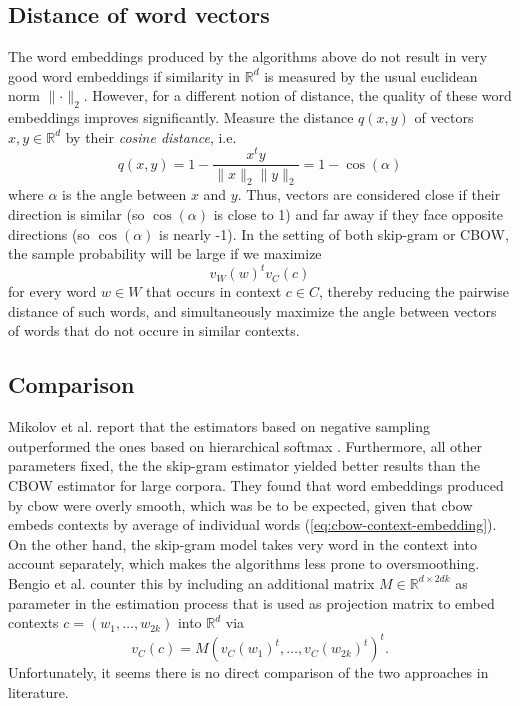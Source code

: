 \documentclass{amsart}
\theoremstyle{plain}
\theoremstyle{definition}
\newcommand{\R}{\mathbb{R}}
\begin{document}
\subsection{Distance of word vectors}
The word embeddings produced by the algorithms above do not result in very good word embeddings if similarity in $\R^d$ is measured by the usual euclidean norm $\lVert \cdot \rVert_2$.
However, for a different notion of distance, the quality of these word embeddings improves significantly.
Measure the distance $q(x, y)$ of vectors $x, y \in \R^d$ by their \emph{cosine distance}, i.e.
\begin{equation*}
  q(x, y) = 1 - \frac{x^t y}{\lVert x \rVert_2 \lVert y \rVert_2} = 1 - \cos(\alpha)
\end{equation*}
where $\alpha$ is the angle between $x$ and $y$.
Thus, vectors are considered close if their direction is similar (so $\cos(\alpha)$ is close to 1) and far away if they face opposite directions (so $\cos(\alpha)$ is nearly -1).
In the setting of both skip-gram or CBOW, the sample probability will be large if we maximize
\begin{equation*}
  v_W(w)^t v_C(c)
\end{equation*}
for every word $w \in W$ that occurs in context $c \in C$, thereby reducing the pairwise distance of such words, and simultaneously maximize the angle between vectors of words that do not occure in similar contexts.

\subsection{Comparison}
Mikolov et al. report that the estimators based on negative sampling outperformed the ones based on hierarchical softmax \cite{DBLP:journals/corr/abs-1301-3781}.
Furthermore, all other parameters fixed, the the skip-gram estimator yielded better results than the CBOW estimator for large corpora.
They found that word embeddings produced by cbow were overly smooth, which was be to be expected, given that cbow embeds contexts by average of individual words (\ref{eq:cbow-context-embedding}).
On the other hand, the skip-gram model takes very word in the context into account separately, which makes the algorithms less prone to oversmoothing.
Bengio et al. \cite{Morin05hierarchicalprobabilistic} counter this by including an additional matrix $M \in \R^{d \times 2dk}$ as parameter in the estimation process that is used as projection matrix to embed contexts $c = (w_1, \dots, w_{2k})$ into $\R^d$ via
\begin{equation}
  v_C(c) = M (v_C(w_1)^t, \dots, v_C(w_{2k})^t)^t.
\end{equation}
Unfortunately, it seems there is no direct comparison of the two approaches in literature.
\end{document}

